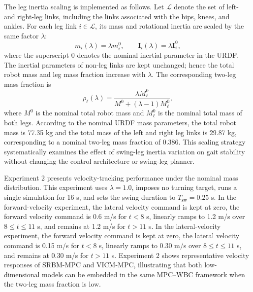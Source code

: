 \documentclass[5p,times]{elsarticle}
\begin{document}
The leg inertia scaling is implemented as follows. Let $\mathcal{L}$ denote the set of left- and right-leg links, including the links associated with the hips, knees, and ankles. For each leg link $i\in\mathcal{L}$, its mass and rotational inertia are scaled by the same factor $\lambda$:
\begin{equation}
m_i(\lambda)=\lambda m_i^0,\qquad
\bm I_i(\lambda)=\lambda \bm I_i^0 ,
\label{eq:leg_lambda_scaling}
\end{equation}
where the superscript 0 denotes the nominal inertial parameter in the URDF. The inertial parameters of non-leg links are kept unchanged; hence the total robot mass and leg mass fraction increase with $\lambda$. The corresponding two-leg mass fraction is
\begin{equation}
\rho_\ell(\lambda)=
\frac{\lambda M_\ell^0}{M^0+(\lambda-1)M_\ell^0},
\label{eq:leg_mass_fraction_lambda}
\end{equation}
where $M^0$ is the nominal total robot mass and $M_\ell^0$ is the nominal total mass of both legs. According to the nominal URDF mass parameters, the total robot mass is 77.35 kg and the total mass of the left and right leg links is 29.87 kg, corresponding to a nominal two-leg mass fraction of 0.386. This scaling strategy systematically examines the effect of swing-leg inertia variation on gait stability without changing the control architecture or swing-leg planner.

Experiment 2 presents velocity-tracking performance under the nominal mass distribution. This experiment uses $\lambda=1.0$, imposes no turning target, runs a single simulation for 16 s, and sets the swing duration to $T_{\mathrm{sw}}=0.25$ s. In the forward-velocity experiment, the lateral velocity command is kept at zero, the forward velocity command is 0.6 m/s for $t<8$ s, linearly ramps to 1.2 m/s over $8\le t\le11$ s, and remains at 1.2 m/s for $t>11$ s. In the lateral-velocity experiment, the forward velocity command is kept at zero, the lateral velocity command is 0.15 m/s for $t<8$ s, linearly ramps to 0.30 m/s over $8\le t\le11$ s, and remains at 0.30 m/s for $t>11$ s. Experiment 2 shows representative velocity responses of SRBM-MPC and VICM-MPC, illustrating that both low-dimensional models can be embedded in the same MPC--WBC framework when the two-leg mass fraction is low.
\end{document}
